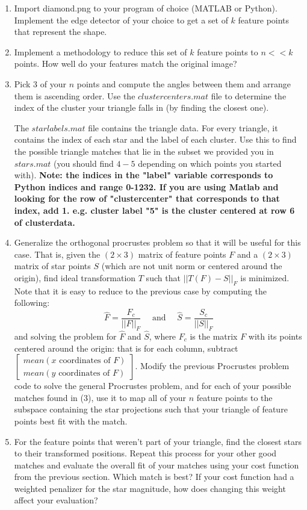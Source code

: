 \documentclass[paper=a4, fontsize=11pt]{scrartcl} %
\begin{document}
\begin{enumerate}
  \item
  Import diamond.png to your program of choice (MATLAB or Python). Implement the edge detector of your choice to get a set of $k$ feature points that represent the shape. 
  \item 
  Implement a methodology to reduce this set of $k$ feature points to $n << k$  points. How well do your features match the original image?
  \item
    Pick $3$ of your $n$ points and compute the angles between them and arrange them is ascending order. Use the $clustercenters.mat$ file to determine the index of the cluster your triangle falls in (by finding the closest one).
    
    The $starlabels.mat$ file contains the triangle data. For every triangle, it contains the index of each star and the label of each cluster. Use this to find the possible triangle matches that lie in the subset we provided you in $stars.mat$ (you should find $4-5$ depending on which points you started with).  \textbf{Note: the indices in the "label" variable corresponds to Python indices and range 0-1232. If you are using Matlab and looking for the row of "clustercenter" that corresponds to that index, add 1. e.g. cluster label "5" is the cluster centered at row 6 of clusterdata.}
  \item
  Generalize the orthogonal procrustes problem so that it will be useful for this case. That is, given the $(2\times 3)$ matrix of feature points $F$ and a  $(2\times 3)$ matrix of star points $S$ (which are not unit norm or centered around the origin), find ideal transformation $T$ such that $||T(F)-S||_F$ is minimized.  Note that it is easy to reduce to the previous case by computing the following:
  $$
  \hat{F} = \frac{F_c}{||F||_F} \quad\textrm{ and }\quad\hat{S} = \frac{S_c}{||S||_F}
  $$
  and solving the problem for $\hat{F}$ and $\hat{S}$, where $F_c$ is the matrix $F$ with its points centered around the origin: that is for each column, subtract $\begin{bmatrix}
mean(x \textrm{ coordinates of } F)\\
mean(y \textrm{ coordinates of } F)
  \end{bmatrix}$. Modify the previous Procrustes problem code to solve the general Procrustes problem, and for each of your possible matches found in (3), use it to map all of your $n$ feature points to the subspace containing the star projections such that your triangle of feature points best fit with the match.
  \item
  For the feature points that weren't part of your triangle, find the closest stars to their transformed positions. Repeat this process for your other good matches and evaluate the overall fit of your matches using your cost function from the previous section. Which match is best? If your cost function had a weighted penalizer for the star magnitude, how does changing this weight affect your evaluation?
\end{enumerate}
\end{document}
